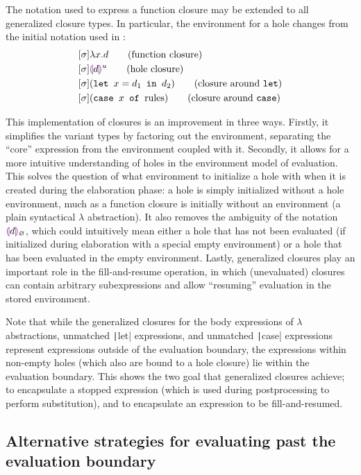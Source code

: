 The notation used to express a function closure may be extended to all generalized closure types. In particular, the environment for a hole changes from the initial notation used in \cite{conf/popl/HazelnutLive19}:
\begin{align}
  \label{eq:generalized-closure-notation}
  &[\env]\lambda x.d\tag{function closure} \\
  &[\env]\hhole{d}^u\tag{hole closure} \\
  &[\env](\texttt{let }x=d_1\texttt{ in }d_2)\tag{closure around \texttt{let}} \\
  &[\env](\texttt{case }x\texttt{ of }\text{rules})\tag{closure around \texttt{case}}
\end{align}

This implementation of closures is an improvement in three ways. Firstly, it simplifies the variant types by factoring out the environment, separating the ``core'' expression from the environment coupled with it. Secondly, it allows for a more intuitive understanding of holes in the environment model of evaluation. This solves the question of what environment to initialize a hole with when it is created during the elaboration phase: a hole is simply initialized without a hole environment, much as a function closure is initially without an environment (a plain syntactical $\lambda$ abstraction). It also removes the ambiguity of the notation $\textcolor{violet}{\llparenthesis} d\textcolor{violet}{\rrparenthesis}_\varnothing$, which could intuitively mean either a hole that has not been evaluated (if initialized during elaboration with a special empty environment) or a hole that has been evaluated in the empty environment. Lastly, generalized closures play an important role in the fill-and-resume operation, in which (unevaluated) closures can contain arbitrary subexpressions and allow ``resuming'' evaluation in the stored environment.

Note that while the generalized closures for the body expressions of $\lambda$ abstractions, unmatched \texttt|let| expressions, and unmatched \texttt|case| expressions represent expressions outside of the evaluation boundary, the expressions within non-empty holes (which also are bound to a hole closure) lie within the evaluation boundary. This shows the two goal that generalized closures achieve; to encapsulate a stopped expression (which is used during postprocessing to perform substitution), and to encapsulate an expression to be fill-and-resumed.

\subsection{Alternative strategies for evaluating past the evaluation boundary}
\label{sec:alt_strat_unevaluated}

